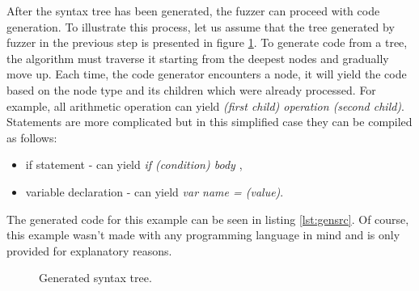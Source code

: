 After the syntax tree has been generated, the fuzzer can proceed with code generation. To illustrate this process, let us assume that the tree generated by fuzzer in the previous step is presented in figure \ref{fig:gentree}. To generate code from a tree, the algorithm must traverse it starting from the deepest nodes and gradually move up. Each time, the code generator encounters a node, it will yield the code based on the node type and its children which were already processed. For example, all arithmetic operation can yield \textit{(first child) operation (second child)}. Statements are more complicated but in this simplified case they can be compiled as follows:
\begin{itemize}
    \item if statement - can yield \textit{if (condition) { body }},
    \item variable declaration - can yield \textit{var name = (value)}.
\end{itemize}
The generated code for this example can be seen in listing \ref{lst:gensrc}. Of course, this example wasn't made with any programming language in mind and is only provided for explanatory reasons.

\begin{figure}[h!]
    \centering

    
    \caption{Generated syntax tree.}
    \label{fig:gentree}
\end{figure}

